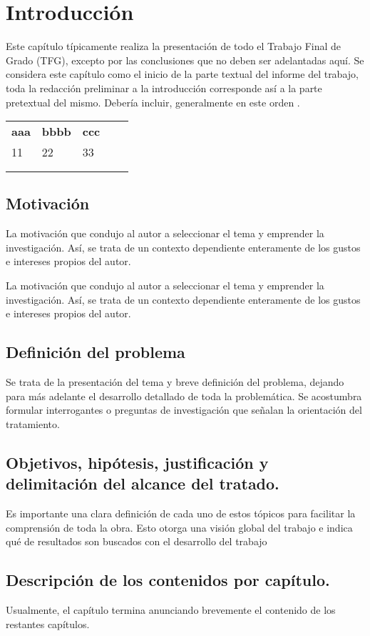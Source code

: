 \fancyhead{}
\fancyfoot{}
\cfoot{\thepage}

\chapter{Introducción}

Este capítulo típicamente realiza la presentación de todo el Trabajo Final de Grado (TFG), excepto por las conclusiones que no deben ser adelantadas aquí. Se considera este capítulo como el inicio de la parte textual del informe del trabajo, toda la redacción preliminar a la introducción corresponde así a la parte pretextual del mismo. Debería incluir, generalmente en este orden \cite{sampieri}.

\begin{table}[]
\begin{tabular}{lllll}
\textbf{aaa} & \textbf{bbbb} & \textbf{ccc} &  &  \\
11           & 22            & 33           &  &  \\
             &               &              &  &  \\
             &               &              &  & 
\end{tabular}
\end{table}
\section{Motivación}
La motivación que condujo al autor a seleccionar el tema y emprender la investigación. Así, se trata de un contexto dependiente enteramente de los gustos e intereses propios del autor.

La motivación que condujo al autor a seleccionar el tema y emprender la investigación. Así, se trata de un contexto dependiente enteramente de los gustos e intereses propios del autor.

   \section{Definición del problema}
Se trata de la presentación del tema y breve definición del problema, dejando para más adelante el desarrollo detallado de toda la problemática. Se acostumbra formular interrogantes o preguntas de investigación que señalan la orientación del tratamiento.

\section{Objetivos, hipótesis, justificación y delimitación del alcance del tratado.}
Es importante una clara definición de cada uno de estos tópicos para facilitar la comprensión de toda la obra. Esto otorga una visión global del trabajo e indica qué de resultados son buscados con el desarrollo del trabajo

\section{Descripción de los contenidos por capítulo.} 
Usualmente, el capítulo termina anunciando brevemente el contenido de los restantes capítulos.

